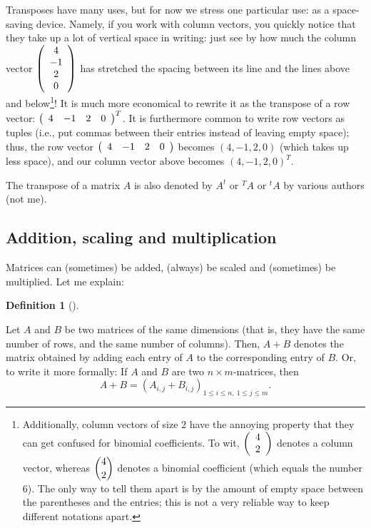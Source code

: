 \documentclass[numbers=enddot,12pt,final,onecolumn,notitlepage]{scrartcl}%
\theoremstyle{definition}
\newtheorem{defi}[theo]{Definition}
\newenvironment{definition}[1][]
{\begin{defi}[#1]\begin{leftbar}}
{\end{leftbar}\end{defi}}
\begin{document}
Transposes have many uses, but for now we stress one particular use: as a
space-saving device. Namely, if you work with column vectors, you quickly
notice that they take up a lot of vertical space in writing: just see by how
much the column vector $\left(
\begin{array}
[c]{c}%
4\\
-1\\
2\\
0
\end{array}
\right)  $ has stretched the spacing between its line and the lines above and
below\footnote{Additionally, column vectors of size $2$ have the annoying
property that they can get confused for binomial coefficients. To wit,
$\left(
\begin{array}
[c]{c}%
4\\
2
\end{array}
\right)  $ denotes a column vector, whereas $\dbinom{4}{2}$ denotes a binomial
coefficient (which equals the number $6$). The only way to tell them apart is
by the amount of empty space between the parentheses and the entries; this is
not a very reliable way to keep different notations apart.}! It is much more
economical to rewrite it as the transpose of a row vector: $\left(
\begin{array}
[c]{cccc}%
4 & -1 & 2 & 0
\end{array}
\right)  ^{T}$. It is furthermore common to write row vectors as tuples (i.e.,
put commas between their entries instead of leaving empty space); thus, the
row vector $\left(
\begin{array}
[c]{cccc}%
4 & -1 & 2 & 0
\end{array}
\right)  $ becomes $\left(  4,-1,2,0\right)  $ (which takes up less space),
and our column vector above becomes $\left(  4,-1,2,0\right)  ^{T}$.

The transpose of a matrix $A$ is also denoted by $A^{t}$ or $^{T}A$ or $^{t}A$
by various authors (not me).

\subsection{Addition, scaling and multiplication}

Matrices can (sometimes) be added, (always) be scaled and (sometimes) be
multiplied. Let me explain:

\begin{definition}
Let $A$ and $B$ be two matrices of the same dimensions (that is, they have the
same number of rows, and the same number of columns). Then, $A+B$ denotes the
matrix obtained by adding each entry of $A$ to the corresponding entry of $B$.
Or, to write it more formally: If $A$ and $B$ are two $n\times m$-matrices,
then%
\[
A+B=\left(  A_{i,j}+B_{i,j}\right)  _{1\leq i\leq n,\ 1\leq j\leq m}.
\]

\end{definition}
\end{document}
